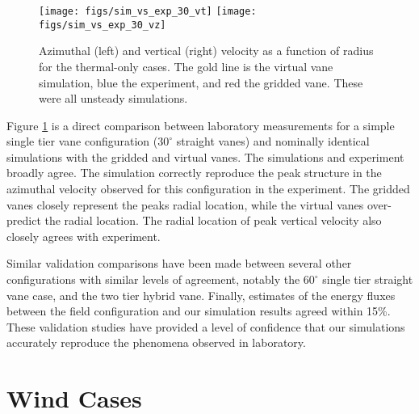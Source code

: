 
\begin{figure}[htp!]

  \centering
  \texttt{[image: figs/sim\_vs\_exp\_30\_vt]}
 \hfill
 \texttt{[image: figs/sim\_vs\_exp\_30\_vz]}%
 \caption{Azimuthal (left) and vertical (right) velocity 
 as a function of radius for the thermal-only cases. The gold line is
 the virtual vane simulation, blue the experiment, and red the gridded
 vane. These were all unsteady simulations.} 
 \label{fig:val_lab}  
\end{figure}

Figure \ref{fig:val_lab} is a direct comparison between laboratory 
measurements for a simple single tier vane configuration ($30^{\circ}$
straight vanes) and nominally identical simulations with the gridded and
virtual vanes. The simulations and experiment broadly agree. The
simulation correctly reproduce the peak structure in the azimuthal
velocity observed for this configuration in the experiment. The gridded
vanes closely represent the peaks radial location, while the
virtual vanes over-predict the radial location. The radial location of
peak vertical velocity also closely agrees with experiment.

Similar validation comparisons have been made between several other
configurations with similar levels of agreement,  notably the
$60^{\circ}$ single tier straight vane case, and the two tier hybrid
vane.  Finally, estimates of the energy fluxes between the field
configuration and our simulation results agreed within 15\%. These
validation studies have provided a level of confidence that our
simulations accurately reproduce the phenomena observed in laboratory.

\section{Wind Cases}

